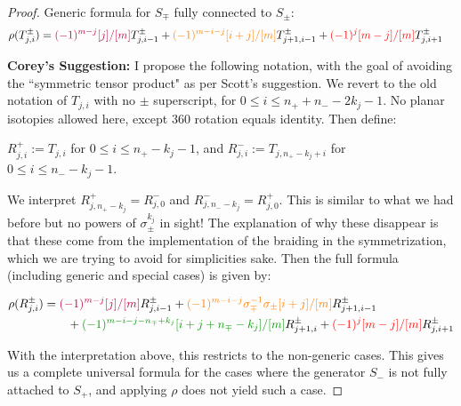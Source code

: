 \documentclass{article}
\begin{document}
\begin{proof}
Generic formula for $S_\mp$ fully connected to $S_\pm$:
\begin{align*}
\rho(T^\pm_{j,i}) 
&= 
\textcolor{purple}{(-1)^{m-j}[j]/[m]} T^\pm_{j,i-1}
+\textcolor{orange}{(-1)^{m-i-j} [i+j]/[m] } T^\pm_{j+1,i-1}
+\textcolor{red}{(-1)^j [m-j]/[m]} T^\pm_{j,i+1}
\end{align*}


\bigskip

\textbf{Corey's Suggestion:}  I propose the following notation, with the goal of avoiding the ``symmetric tensor product" as per Scott's suggestion.  We revert to the old notation of $T_{j,i}$ with no $\pm$ superscript, for $0\le i\le n_{+}+n_{-}-2k_{j}-1$.  No planar isotopies allowed here, except 360 rotation equals identity.  Then define:

\medskip

$R^{+}_{j,i}:=T_{j,i}$ for $0\le i\le n_{+}-k_{j}-1$, and $R^{-}_{j,i}:=T_{j,n_{+}-k_{j}+i}$ for $0\le i\le n_{-}-k_{j}-1$.

We interpret $R^{+}_{j,n_{+}-k_{j}}=R^{-}_{j,0}$ and $R^{-}_{j,n_{-}-k_{j}}=R^{+}_{j,0}$.  This is similar to what we had before but no powers of $\sigma_{\pm}^{k_j}$ in sight!  The explanation of why these disappear is that these come from the implementation of the braiding in the symmetrization, which we are trying to avoid for simplicities sake.  Then the full formula (including generic and special cases) is given by:
 
 \begin{align*}
\rho(R^\pm_{j,i}) 
&= 
\textcolor{purple}{(-1)^{m-j}[j]/[m]} R^\pm_{j,i-1}
+\textcolor{orange}{(-1)^{m-i-j} \sigma^{-1}_\mp\sigma_\pm [i+j]/[m] } R^\pm_{j+1,i-1}
\\ &\qquad
+\textcolor{DarkGreen}{(-1)^{m-i-j-n_{\mp}+k_j}[i+j+n_{\mp}-k_j]/[m]} R^\pm_{j+1,i}
+\textcolor{red}{(-1)^j [m-j]/[m]} R^\pm_{j,i+1}
\end{align*}
 
With the interpretation above, this restricts to the non-generic cases.  This gives us a complete universal formula for the cases where the generator $S_{-}$ is not fully attached to $S_{+}$, and applying $\rho$ does not yield such a case.


\end{proof}
\end{document}
